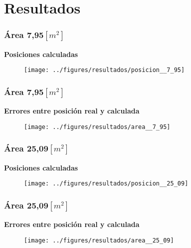 \documentclass[mathserif]{beamer}
\begin{document}
\section{Resultados}

\begin{frame}
\frametitle{Área 7,95$[m^2]$}

\textbf{Posiciones calculadas}

\begin{figure}
\texttt{[image: ../figures/resultados/posicion\_\_7\_95]}
\end{figure}


\end{frame}


\begin{frame}
\frametitle{Área 7,95$[m^2]$}

\textbf{Errores entre posición real y calculada}

\begin{figure}
\texttt{[image: ../figures/resultados/area\_\_7\_95]}
\end{figure}



\end{frame}


\begin{frame}
\frametitle{Área 25,09$[m^2]$}

\textbf{Posiciones calculadas}

\begin{figure}
\texttt{[image: ../figures/resultados/posicion\_\_25\_09]}
\end{figure}


\end{frame}


\begin{frame}
\frametitle{Área 25,09$[m^2]$}

\textbf{Errores entre posición real y calculada}

\begin{figure}
\texttt{[image: ../figures/resultados/area\_\_25\_09]}
\end{figure}



\end{frame}
\end{document}
